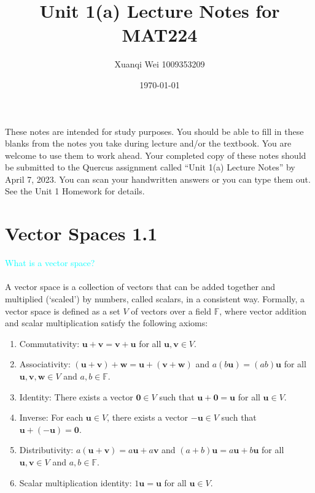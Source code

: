 \documentclass[fontsize=12pt]{scrartcl}
\title{Unit 1(a) Lecture Notes for MAT224}
\author{Xuanqi Wei 1009353209}
\date{\today}
\begin{document}
\maketitle

\noindent
These notes are intended for study purposes. You should be able to fill in these blanks from the notes you take during lecture and/or the textbook. You are welcome to use them to work ahead. Your completed copy of these notes should be submitted to the Quercus assignment called ``Unit 1(a) Lecture Notes'' by April 7, 2023. You can scan your handwritten answers or you can type them out. See the Unit 1 Homework for details.

\newpage

\section{Vector Spaces 1.1}

\textcolor{cyan}{What is a vector space?}\\
\\
A vector space is a collection of vectors that can be added together and multiplied (`scaled') by numbers, called scalars, in a consistent way. Formally, a vector space is defined as a set $V$ of vectors over a field $\mathbb{F}$, where vector addition and scalar multiplication satisfy the following axioms:

\begin{enumerate}
	\item Commutativity: $\mathbf{u}+\mathbf{v}=\mathbf{v}+\mathbf{u}$ for all $\mathbf{u},\mathbf{v}\in V$.
	\item Associativity: $(\mathbf{u}+\mathbf{v})+\mathbf{w}=\mathbf{u}+(\mathbf{v}+\mathbf{w})$ and $a(b\mathbf{u})=(ab)\mathbf{u}$ for all $\mathbf{u},\mathbf{v},\mathbf{w}\in V$ and $a,b\in\mathbb{F}$.
	\item Identity: There exists a vector $\mathbf{0}\in V$ such that $\mathbf{u}+\mathbf{0}=\mathbf{u}$ for all $\mathbf{u}\in V$.
	\item Inverse: For each $\mathbf{u}\in V$, there exists a vector $-\mathbf{u}\in V$ such that $\mathbf{u}+(-\mathbf{u})=\mathbf{0}$.
	\item Distributivity: $a(\mathbf{u}+\mathbf{v})=a\mathbf{u}+a\mathbf{v}$ and $(a+b)\mathbf{u}=a\mathbf{u}+b\mathbf{u}$ for all $\mathbf{u},\mathbf{v}\in V$ and $a,b\in\mathbb{F}$.
	\item Scalar multiplication identity: $1\mathbf{u}=\mathbf{u}$ for all $\mathbf{u}\in V$.
\end{enumerate}
\end{document}
